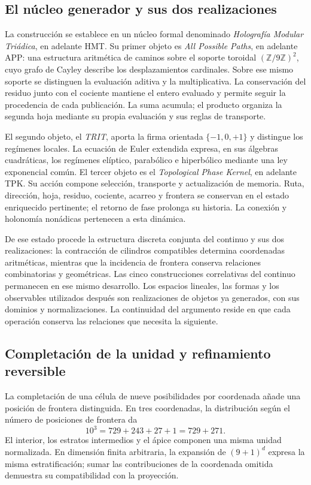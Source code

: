\subsection*{El núcleo generador y sus dos realizaciones}
La construcción se establece en un núcleo formal denominado \emph{Holografía Modular Triádica}, en adelante HMT. Su primer objeto es \emph{All Possible Paths}, en adelante APP: una estructura aritmética de caminos sobre el soporte toroidal \((\mathbb Z/9\mathbb Z)^2\), cuyo grafo de Cayley describe los desplazamientos cardinales. Sobre ese mismo soporte se distinguen la evaluación aditiva y la multiplicativa. La conservación del residuo junto con el cociente mantiene el entero evaluado y permite seguir la procedencia de cada publicación. La suma acumula; el producto organiza la segunda hoja mediante su propia evaluación y sus reglas de transporte.

El segundo objeto, el \emph{TRIT}, aporta la firma orientada \(\{-1,0,+1\}\) y distingue los regímenes locales. La ecuación de Euler extendida expresa, en sus álgebras cuadráticas, los regímenes elíptico, parabólico e hiperbólico mediante una ley exponencial común. El tercer objeto es el \emph{Topological Phase Kernel}, en adelante TPK. Su acción compone selección, transporte y actualización de memoria. Ruta, dirección, hoja, residuo, cociente, acarreo y frontera se conservan en el estado enriquecido pertinente; el retorno de fase prolonga su historia. La conexión y holonomía nonádicas pertenecen a esta dinámica.

De ese estado procede la estructura discreta conjunta del continuo y sus dos realizaciones: la contracción de cilindros compatibles determina coordenadas aritméticas, mientras que la incidencia de frontera conserva relaciones combinatorias y geométricas. Las cinco construcciones correlativas del continuo permanecen en ese mismo desarrollo. Los espacios lineales, las formas y los observables utilizados después son realizaciones de objetos ya generados, con sus dominios y normalizaciones. La continuidad del argumento reside en que cada operación conserva las relaciones que necesita la siguiente.

\subsection*{Completación de la unidad y refinamiento reversible}
La completación de una célula de nueve posibilidades por coordenada añade una posición de frontera distinguida. En tres coordenadas, la distribución según el número de posiciones de frontera da
\[
10^3=729+243+27+1=729+271.
\]
El interior, los estratos intermedios y el ápice componen una misma unidad normalizada. En dimensión finita arbitraria, la expansión de \((9+1)^d\) expresa la misma estratificación; sumar las contribuciones de la coordenada omitida demuestra su compatibilidad con la proyección.

